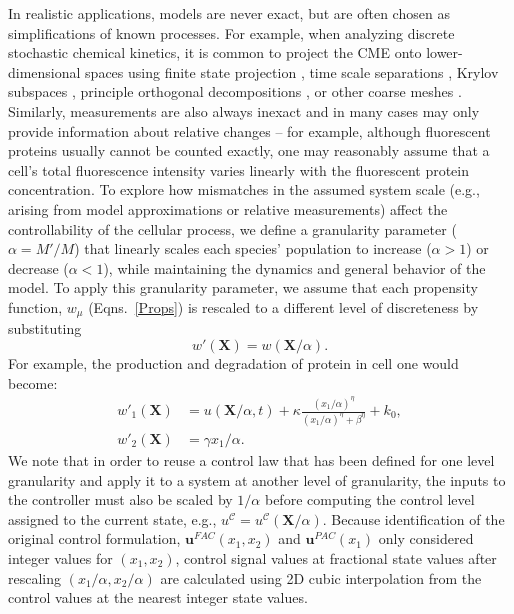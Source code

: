 \documentclass[12pt]{iopart}
\begin{document}
In realistic applications, models are never exact, but are often chosen as simplifications of known processes. 
For example, when analyzing discrete stochastic chemical kinetics, it is common to project the CME onto lower-dimensional spaces using finite state projection \cite{Munsky2006}, time scale separations \cite{Peles2006}, Krylov subspaces \cite{Macnamara2008}, principle orthogonal decompositions \cite{Vo2019}, or other coarse meshes \cite{Munsky2008IEEE,Tapia2012}. 
Similarly, measurements are also always inexact and in many cases may only provide information about relative changes -- for example, although fluorescent proteins usually cannot be counted exactly, one may reasonably assume that a cell's total fluorescence intensity varies linearly with the fluorescent protein concentration. 
To explore how mismatches in the assumed system scale (e.g., arising from model approximations or relative measurements) affect the controllability of the cellular process, we define a granularity parameter ($\alpha=M'/M$) that linearly scales each species' population to increase ($\alpha>1$) or decrease ($\alpha<1$), while maintaining the dynamics and general behavior of the model. 
To apply this granularity parameter, we assume that each propensity function, $w_{\mu}$ (Eqns.\ \ref{Props}) is rescaled to a different level of discreteness by substituting
\begin{equation}\label{eq:granscale}
w'(\mathbf{X})=w(\mathbf{X}/\alpha).
\end{equation}
For example, the production and degradation of protein in cell one would become:
\begin{eqnarray}
w'_1(\mathbf{X}) &= u(\mathbf{X}/\alpha,t)  + \kappa \frac{(x_1/\alpha)^\eta}{(x_1/\alpha)^{\eta}+\beta^{\eta}} + k_0, \nonumber \\
 w'_2(\mathbf{X}) &= \gamma x_1/\alpha. \label{eq:rescaling}
\end{eqnarray}
We note that in order to reuse a control law that has been defined for one level granularity and apply it to a system at another level of granularity, the inputs to the controller must also be scaled by $1/\alpha$ before computing the  control level assigned to the current state, e.g., ${u}^{\mathcal{C}} = {u}^{\mathcal{C}}(\mathbf{X}/\alpha)$. Because identification of the original control formulation, $\mathbf{u}^{FAC}(x_1,x_2)$ and $\mathbf{u}^{PAC}(x_1)$ only considered integer values for $(x_1,x_2)$, control signal values at fractional state values after rescaling $(x_1/\alpha,x_2/\alpha)$ are calculated using 2D cubic interpolation from the control values at the nearest integer state values.
\end{document}
